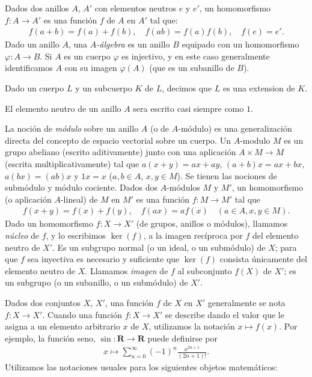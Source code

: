 \documentclass[bibtotoc,leqno,spanish]{amsbook}
\newcommand{\RR}{\mathbf{R}}
\renewcommand{\to}[1][]{\xrightarrow{#1}}
\numberwithin{equation}{section}
\theoremstyle{note}
\theoremstyle{note}
\theoremstyle{rem}
\numberwithin{theorem}{section}
\numberwithin{proposition}{section}
\numberwithin{definition}{section}
\numberwithin{lemma}{section}
\numberwithin{corollary}{section}
\numberwithin{example}{section}
\numberwithin{footnote}{section}%
\begin{document}
Dados dos anillos $A$, $A'$ con elementos neutros $e$ y $e'$, un homomorfismo $f:A\to A'$ es una
funci\'on $f$ de $A$ en $A'$ tal que:
\begin{gather*}
f(a+b)=f(a)+f(b),\quad f(ab) = f(a)f(b),\quad f(e) = e'.
\end{gather*}
Dado un anillo $A$, una \emph{$A$-\'algebra} es un anillo $B$ equipado con un homomorfismo
$\varphi:A\to B$. Si $A$ es un cuerpo $\varphi$ es injectivo, y en este caso generalmente
identificamos $A$ con su imagen $\varphi(A)$ (que es un subanillo de $B$).

Dado un cuerpo $L$ y un subcuerpo $K$ de $L$, decimos que $L$ es una extension de $K$.

El elemento neutro de un anillo $A$ sera escrito casi siempre como $1$.

La noci\'on de \emph{m\'odulo} sobre un anillo $A$ (o de $A$-m\'odulo) es una generalizaci\'on
directa del concepto de espacio vectorial sobre un cuerpo. Un $A$-modulo $M$ es un grupo abeliano
(escrito aditivamente) junto con una aplicaci\'on $A\times M\to M$ (escrita multiplicativamente)
tal que $a(x+y)=ax+ay$, $(a+b)x = ax+bx$, $a(bx) = (ab)x$ y $1x = x$ ($a,b\in A$, $x,y\in M$).
Se tienen las nociones de subm\'odulo y m\'odulo cociente. Dados dos $A$-m\'odulos $M$ y $M'$,
un homomorfismo (o aplicaci\'on $A$-lineal) de $M$ en $M'$ es una
funci\'on $f:M\to M'$ tal que
\begin{gather*}
f(x+y) = f(x)+f(y),\quad f(ax) = af(x)\quad(a\in A, x,y\in M).
\end{gather*}
Dado un homomorfismo $f:X\to X'$ (de grupos, anillos o m\'odulos), llamamos \emph{n\'ucleo} de
$f$, y lo escribimos $\ker(f)$, a la imagen rec\'iproca por $f$ del elemento neutro de $X'$. Es un
subgrupo normal (o un ideal, o un subm\'odulo) de $X$; para que $f$ sea inyectiva es necesario y
suficiente que $\ker(f)$ consista \'unicamente del elemento neutro de $X$. Llamamos \emph{imagen}
de $f$ al subconjunto $f(X)$ de $X'$; es un subgrupo (o un subanillo, o un subm\'odulo) de $X'$.

Dados dos conjuntos $X$, $X'$, una funci\'on $f$ de $X$ en $X'$ generalmente se nota
$f:X\to X'$. Cuando una funci\'on $f:X\to X'$ se describe dando el valor que
le asigna a un elemento arbitrario $x$ de $X$, utilizamos la notaci\'on $x\mapsto f(x)$.
Por ejemplo, la funci\'on seno, $\sin:\RR\to\RR$ puede definirse por
\begin{gather*}
x\mapsto\sum_{n=0}^{\infty}(-1)^{n}\frac{x^{2n+1}}{(2n+1)!}.
\end{gather*}
Utilizamos las notaciones usuales para los siguientes objetos matem\'aticos:
\end{document}
